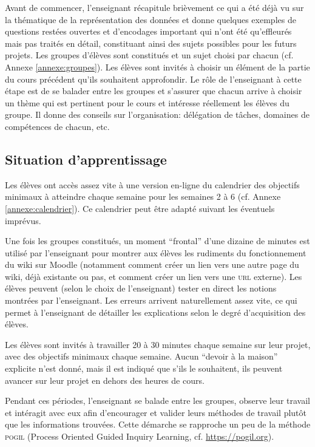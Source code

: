 \documentclass[11pt,bibliography=totoc]{scrartcl}
\newcommand\ajout[1]{{\color{blue} #1}}
\newcommand\rajout[1]{{\color{green} #1}}
\begin{document}
\rajout{Avant de commencer, l'enseignant récapitule brièvement ce qui a été déjà
  vu sur la thématique de la représentation des données et donne quelques
  exemples de questions restées ouvertes et d'encodages important qui n'ont été
  qu'effleurés mais pas traités en détail, constituant ainsi des sujets
  possibles pour les futurs projets.}  Les groupes d'élèves sont constitués et
un sujet choisi par chacun (cf. Annexe \ref{annexe:groupes}). Les élèves sont
invités à choisir un élément de la partie du cours précédent qu'ils souhaitent
approfondir. Le rôle de l'enseignant à cette étape est de se balader entre les
groupes et s'assurer que chacun arrive à choisir un thème qui est pertinent pour
le cours et intéresse réellement les élèves du groupe. \ajout{Il donne des
  conseils sur l'organisation: délégation de tâches, domaines de compétences de
  chacun, etc.}

\subsection{Situation d'apprentissage}
Les élèves ont accès assez vite à une version en-ligne du calendrier des
objectifs minimaux à atteindre chaque semaine pour les semaines 2 à 6
\rajout{(cf. Annexe \ref{annexe:calendrier})}. Ce calendrier peut être adapté
suivant les éventuels imprévus.

Une fois les groupes constitués, un moment ``frontal'' d'une dizaine de minutes
est utilisé par l'enseignant pour montrer aux élèves les rudiments du
fonctionnement du wiki sur Moodle (notamment comment créer un lien vers une
autre page du wiki, déjà existante ou pas, et comment créer un lien vers une
\textsc{url} externe). \ajout {Les élèves peuvent (selon le choix de
  l'enseignant) tester en direct les notions montrées par l'enseignant. Les
  erreurs arrivent naturellement assez vite, ce qui permet à l'enseignant de
  détailler les explications selon le degré d'acquisition des élèves.}

Les élèves sont invités à travailler 20 à 30 minutes chaque semaine sur leur
projet, avec des objectifs minimaux chaque semaine. Aucun ``devoir à la maison''
explicite n'est donné, mais il est indiqué que s'ils le souhaitent, ils peuvent
avancer sur leur projet en dehors des heures de cours.

\rajout{Pendant ces périodes, l'enseignant se balade entre les groupes, observe
  leur travail et intéragit avec eux afin d'encourager et valider leurs méthodes
  de travail plutôt que les informations trouvées. Cette démarche se rapproche
  un peu de la méthode \textsc{pogil} (Process Oriented Guided Inquiry Learning,
  cf. \url{https://pogil.org}).}
\end{document}
